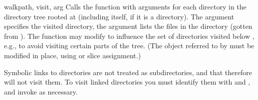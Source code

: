 \begin{funcdesc}{walk}{path, visit, arg}
Calls the function  with arguments
 for each directory in the
directory tree rooted at  (including  itself, if it
is a directory).  The argument  specifies the visited
directory, the argument  lists the files in the directory
(gotten from ).
The  function may modify  to
influence the set of directories visited below , e.g., to
avoid visiting certain parts of the tree.  (The object referred to by
 must be modified in place, using  or slice
assignment.)

\begin{notice}
Symbolic links to directories are not treated as subdirectories, and
that  therefore will not visit them. To visit linked
directories you must identify them with
 and
, and invoke  as
necessary.
\end{notice}
\end{funcdesc}

